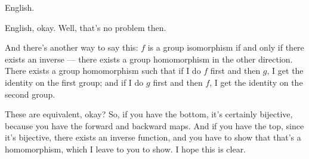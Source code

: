 \begin{student}
English.
\end{student}

\begin{speech}[00:11:49 - 00:12:43]
English, okay. Well, that's no problem then.

And there's another way to say this: $f$ is a group isomorphism  if and only if  there exists an inverse --- there exists a group homomorphism in the other direction. There exists a group homomorphism  such that if I do $f$ first and then $g$, I get the identity on the first group; and if I do $g$ first and then $f$, I get the identity on the second group. 

These are equivalent, okay? So, if you have the bottom, it's certainly bijective, because you have the forward and backward maps. And if you have the top, since it's bijective, there exists an inverse function, and you have to show that that's a homomorphism, which I leave to you to show. I hope this is clear.
\end{speech}

